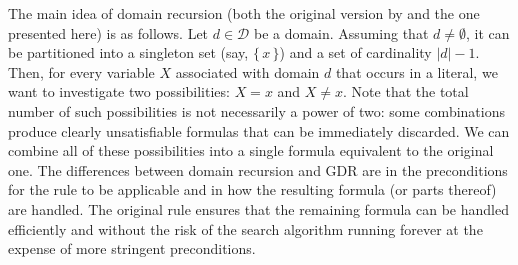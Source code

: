 
The main idea of domain recursion (both the original version by
\citet{DBLP:conf/nips/Broeck11} and the one presented here) is as follows. Let
$d \in \mathcal{D}$ be a domain. Assuming that $d \ne \emptyset$, it can be
partitioned into a singleton set (say, $\{\, x \,\}$) and a set of cardinality
$|d| - 1$. Then, for every variable $X$ associated with domain $d$ that occurs
in a literal, we want to investigate two possibilities: $X = x$ and $X \ne x$.
Note that the total number of such possibilities is not necessarily a power of
two: some combinations produce clearly unsatisfiable formulas that can be
immediately discarded. We can combine all of these possibilities into a single
formula equivalent to the original one. The differences between domain recursion
and GDR are in the preconditions for the rule to be applicable and in how the
resulting formula (or parts thereof) are handled. The original rule ensures that
the remaining formula can be handled efficiently and without the risk of the
search algorithm running forever at the expense of more stringent preconditions.

